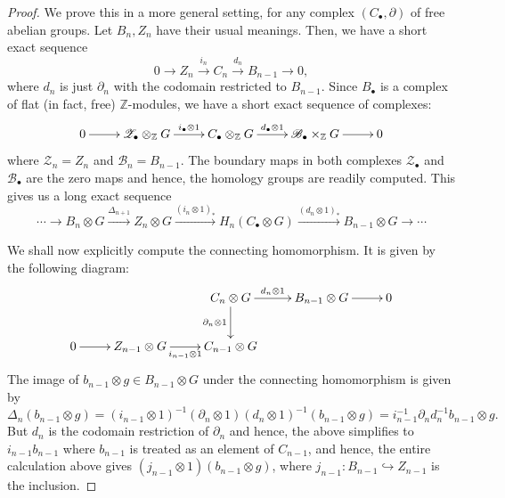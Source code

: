 \documentclass[10pt]{article}
\theoremstyle{thmstyle}
\theoremstyle{defstyle}
\newcommand{\Z}{\mathbb{Z}}
\newcommand{\into}{\hookrightarrow}
\begin{document}
\begin{proof}
    We prove this in a more general setting, for any complex $(C_\bullet, \partial)$ of free abelian groups. Let $B_n, Z_n$ have their usual meanings. Then, we have a short exact sequence 
    \begin{equation*}
        0\to Z_n\stackrel{i_n}{\longrightarrow} C_n\stackrel{d_n}{\longrightarrow} B_{n - 1}\to 0,
    \end{equation*}
    where $d_n$ is just $\partial_n$ with the codomain restricted to $B_{n - 1}$. Since $B_{\bullet}$ is a complex of flat (in fact, free) $\Z$-modules, we have a short exact sequence of complexes: 
    \begin{equation*}
        \xymatrix {
        0\ar[r] & \mathscr{Z}_\bullet\otimes_{\Z} G\ar[r]^-{i_\bullet\otimes 1} & C_\bullet\otimes_\Z G\ar[r]^-{d_\bullet\otimes 1} & \mathscr{B}_\bullet\times_{\Z} G\ar[r] & 0
        }
    \end{equation*}
    where $\mathscr Z_n = Z_n$ and $\mathscr B_n = B_{n - 1}$. The boundary maps in both complexes $\mathscr Z_\bullet$ and $\mathscr B_\bullet$ are the zero maps and hence, the homology groups are readily computed. This gives us a long exact sequence 
    \begin{equation*}
        \cdots\rightarrow B_n\otimes G\xrightarrow{\Delta_{n + 1}} Z_n\otimes G\xrightarrow{(i_n\otimes 1)_\ast} H_n(C_\bullet\otimes G)\xrightarrow{(d_n\otimes 1)_\ast} B_{n - 1}\otimes G\rightarrow\cdots
    \end{equation*}

    We shall now explicitly compute the connecting homomorphism. It is given by the following diagram: 
    \begin{equation*}
        \xymatrix{
        & & C_n\otimes G\ar[r]^-{d_n\otimes 1}\ar[d]_-{\partial_n\otimes 1} & B_{n - 1}\otimes G\ar[r] & 0\\
        0\ar[r] & Z_{n - 1}\otimes G\ar[r]_-{i_{n - 1}\otimes 1} & C_{n - 1}\otimes G
        }
    \end{equation*}
    The image of $b_{n - 1}\otimes g\in B_{n - 1}\otimes G$ under the connecting homomorphism is given by 
    \begin{equation*}
        \Delta_n(b_{n - 1}\otimes g) = (i_{n - 1}\otimes 1)^{-1}(\partial_n\otimes 1)(d_n\otimes 1)^{-1}(b_{n - 1}\otimes g) = i_{n -1}^{-1}\partial_n d_n^{-1}b_{n - 1}\otimes g.
    \end{equation*}
    But $d_n$ is the codomain restriction of $\partial_n$ and hence, the above simplifies to $i_{n - 1}b_{n - 1}$ where $b_{n - 1}$ is treated as an element of $C_{n - 1}$, and hence, the entire calculation above gives $(j_{n - 1}\otimes 1)(b_{n - 1}\otimes g)$, where $j_{n - 1}: B_{n - 1}\into Z_{n - 1}$ is the inclusion.


\end{proof}
\end{document}
